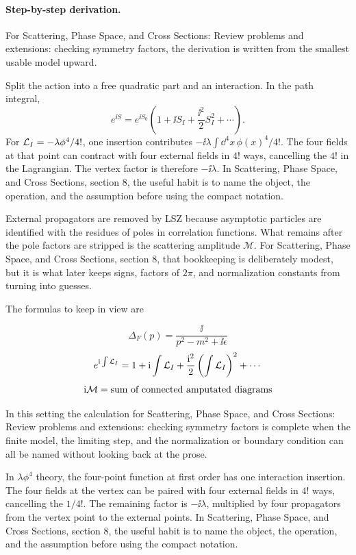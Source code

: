 \paragraph{Step-by-step derivation.}

For Scattering, Phase Space, and Cross Sections: Review problems and extensions: checking symmetry factors, the derivation is written from the smallest usable model upward.

Split the action into a free quadratic part and an interaction.  In the path integral,
\[
  e^{\ii S}=e^{\ii S_0}\left(1+\ii S_I+\frac{\ii^2}{2}S_I^2+\cdots\right).
\]
For \(\mathcal L_I=-\lambda\phi^4/4!\), one insertion contributes \(-\ii\lambda\int\dd^4x\,\phi(x)^4/4!\).  The four fields at that point can contract with four external fields in \(4!\) ways, cancelling the \(4!\) in the Lagrangian.  The vertex factor is therefore \(-\ii\lambda\).  In Scattering, Phase Space, and Cross Sections, section 8, the useful habit is to name the object, the operation, and the assumption before using the compact notation.

External propagators are removed by LSZ because asymptotic particles are identified with the residues of poles in correlation functions.  What remains after the pole factors are stripped is the scattering amplitude \(\mathcal M\).  For Scattering, Phase Space, and Cross Sections, section 8, that bookkeeping is deliberately modest, but it is what later keeps signs, factors of \(2\pi\), and normalization constants from turning into guesses.

The formulas to keep in view are

\[
  \Delta_F(p)=\frac{\ii}{p^2-m^2+\ii\epsilon}
\]
\[
  e^{\mathrm i\int\mathcal L_I}=1+\mathrm i\int\mathcal L_I+\frac{\mathrm i^2}{2}\left(\int\mathcal L_I\right)^2+\cdots
\]
\[
  \mathrm i\mathcal M=\hbox{sum of connected amputated diagrams}
\]

In this setting the calculation for Scattering, Phase Space, and Cross Sections: Review problems and extensions: checking symmetry factors is complete when the finite model, the limiting step, and the normalization or boundary condition can all be named without looking back at the prose.




\begin{example}
In \(\lambda\phi^4\) theory, the four-point function at first order has one interaction insertion.  The four fields at the vertex can be paired with four external fields in \(4!\) ways, cancelling the \(1/4!\).  The remaining factor is \(-\ii\lambda\), multiplied by four propagators from the vertex point to the external points.  In Scattering, Phase Space, and Cross Sections, section 8, the useful habit is to name the object, the operation, and the assumption before using the compact notation.
\end{example}



